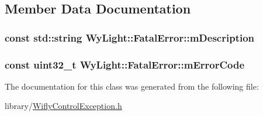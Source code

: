 \subsection{Member Data Documentation}
\hypertarget{class_wy_light_1_1_fatal_error_aeae1bd38ee1c9b21b260a10ecc89b5f4}{
\subsubsection[{m\-Description}]{\setlength{\rightskip}{0pt plus 5cm}const std\-::string Wy\-Light\-::\-Fatal\-Error\-::m\-Description\hspace{0.3cm}{\ttfamily [protected]}}}\label{class_wy_light_1_1_fatal_error_aeae1bd38ee1c9b21b260a10ecc89b5f4}
\hypertarget{class_wy_light_1_1_fatal_error_a7d6df57841d017b51107a80ac6205c93}{
\subsubsection[{m\-Error\-Code}]{\setlength{\rightskip}{0pt plus 5cm}const uint32\-\_\-t Wy\-Light\-::\-Fatal\-Error\-::m\-Error\-Code\hspace{0.3cm}{\ttfamily [protected]}}}\label{class_wy_light_1_1_fatal_error_a7d6df57841d017b51107a80ac6205c93}


The documentation for this class was generated from the following file\-:\begin{DoxyCompactItemize}
\item 
library/\hyperlink{_wifly_control_exception_8h}{Wifly\-Control\-Exception.\-h}\end{DoxyCompactItemize}
